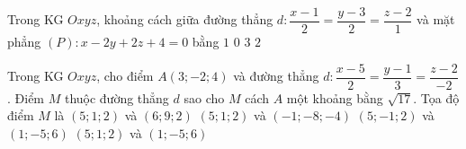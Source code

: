 \begin{ex}%
	Trong KG $Oxyz$, khoảng cách giữa đường thẳng $d\colon \dfrac{x-1}{2}=\dfrac{y-3}{2}=\dfrac{z-2}{1}$ và mặt phẳng $(P)\colon x-2y+2z+4=0$ bằng
	\choice
	{\True $1$}
	{$0$}
	{$3$}
	{$2$}
\end{ex}
\begin{ex}%
	Trong KG $Oxyz$, cho điểm $A(3;-2;4)$ và đường thẳng $d\colon \dfrac{x-5}{2}=\dfrac{y-1}{3}=\dfrac{z-2}{-2}$. Điểm $M$ thuộc đường thẳng $d$ sao cho $M$ cách $A$ một khoảng bằng $\sqrt{17}$. Tọa độ điểm $M$ là
	\choice
	{$(5;1;2)$ và $(6;9;2)$}
	{$(5;1;2)$ và $(-1;-8;-4)$}
	{$(5;-1;2)$ và $(1;-5;6)$}
	{\True $(5;1;2)$ và $(1;-5;6)$}
\end{ex}

